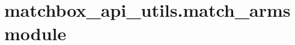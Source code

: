 \documentclass[letterpaper,10pt,english]{sphinxmanual}
\begin{document}
\begin{fulllineitems}
\begin{fulllineitems}
%
\begin{sphinxVerbatim}[commandchars=\\\{\}]
 \PYG{p}{[}\PYG{p}{]}
\end{sphinxVerbatim}

\end{fulllineitems}


\end{fulllineitems}



\section{matchbox\_api\_utils.match\_arms module}
\label{\detokenize{matchbox_api_utils:matchbox-api-utils-match-arms-module}}\label{\detokenize{matchbox_api_utils:module-matchbox_api_utils.match_arms}}
\end{document}
